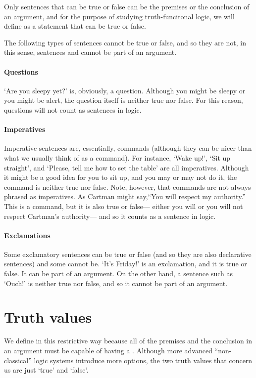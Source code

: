 Only sentences that can be true or false can be the premises or the conclusion of an argument, and for the purpose of studying truth-funcitonal logic, we will define  as a statement that can be true or false.

The following types of sentences cannot be true or false, and so they are not, in this sense, sentences and cannot be part of an argument.

\paragraph{Questions} `Are you sleepy yet?' is, obviously, a question. Although you might be sleepy or you might be alert, the question itself is neither true nor false. For this reason, questions will not count as sentences in logic. 

\paragraph{Imperatives} Imperative sentences are, essentially, commands (although they can be nicer than what we usually think of as a command). For instance, `Wake up!', `Sit up straight', and `Please, tell me how to set the table' are all imperatives. Although it might be a good idea for you to sit up, and you may or may not do it, the command is neither true nor false. Note, however, that commands are not always phrased as imperatives.  As Cartman might say,``You will respect my authority.'' This is a command, but it is also true or false--- either you will or you will not respect Cartman's authority--- and so it counts as a sentence in logic.

\paragraph{Exclamations} Some exclamatory sentences can be true or false (and so they are also declarative sentences) and some cannot be. `It's Friday!' is an exclamation, and it is true or false. It can be part of an argument. On the other hand, a sentence such as `Ouch!' is neither true nor false, and so it cannot be part of an argument. 

\section{Truth values}
We define  in this restrictive way because all of the premises and the conclusion in an argument must be capable of having a . Although more advanced ``non-classical'' logic systems introduce more options, the two truth values that concern us are just `true' and `false'. 

